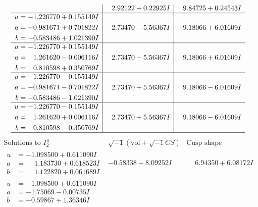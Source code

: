 \documentclass[1p]{elsarticle_modified}
\theoremstyle{definition}
\newcommand{\I}{\sqrt{-1}}
\begin{document}
$$\begin{array}{c|c|c}
 & \phantom{-}2.92122 + 0.22925 I & \phantom{-}9.84725 + 0.24543 I \\ \hline\begin{aligned}
u &= -1.226770 + 0.155149 I \\
a &= -0.981671 + 0.701822 I \\
b &= -0.583486 + 1.021390 I\end{aligned}
 & \phantom{-}2.73470 - 5.56367 I & \phantom{-}9.18066 + 6.01609 I \\ \hline\begin{aligned}
u &= -1.226770 + 0.155149 I \\
a &= \phantom{-}1.261620 - 0.006116 I \\
b &= \phantom{-}0.810598 + 0.350769 I\end{aligned}
 & \phantom{-}2.73470 - 5.56367 I & \phantom{-}9.18066 + 6.01609 I \\ \hline\begin{aligned}
u &= -1.226770 - 0.155149 I \\
a &= -0.981671 - 0.701822 I \\
b &= -0.583486 - 1.021390 I\end{aligned}
 & \phantom{-}2.73470 + 5.56367 I & \phantom{-}9.18066 - 6.01609 I \\ \hline\begin{aligned}
u &= -1.226770 - 0.155149 I \\
a &= \phantom{-}1.261620 + 0.006116 I \\
b &= \phantom{-}0.810598 - 0.350769 I\end{aligned}
 & \phantom{-}2.73470 + 5.56367 I & \phantom{-}9.18066 - 6.01609 I\\
 \hline 
 \end{array}$$\newpage$$\begin{array}{c|c|c}  
\text{Solutions to }I^u_{2}& \I (\text{vol} + \sqrt{-1}CS) & \text{Cusp shape}\\
 \hline 
\begin{aligned}
u &= -1.098500 + 0.611090 I \\
a &= \phantom{-}1.183730 + 0.618523 I \\
b &= \phantom{-}1.122820 + 0.061689 I\end{aligned}
 & -0.58338 - 8.09252 I & \phantom{-}6.94350 + 6.08172 I \\ \hline\begin{aligned}
u &= -1.098500 + 0.611090 I \\
a &= -1.75069 - 0.00735 I \\
b &= -0.59867 + 1.36346 I\end{aligned}

\end{array}$$
\end{document}
